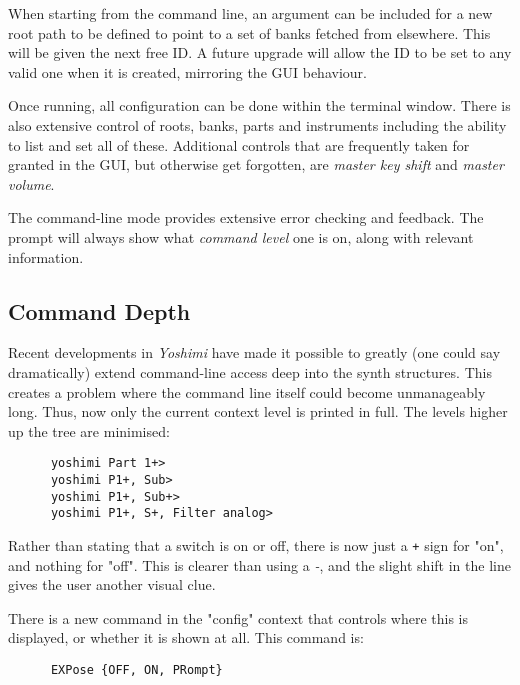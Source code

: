    When starting from the command line, an argument can be included for a new
   root path to be defined to point to a set of banks fetched from elsewhere.
   This will be given the next free ID. A future upgrade will allow the ID to
   be set to any valid one when it is created, mirroring the GUI behaviour.

   Once running, all configuration can be done within the terminal
   window.  There is also extensive control of roots, banks, parts and
   instruments including the ability to list and set all of these.
   Additional controls that are frequently taken for granted in the GUI, but
   otherwise get forgotten, are \textsl{master key shift} and \textsl{master
   volume}.

   The command-line mode provides extensive error checking and feedback.
   The prompt will always show what \textsl{command level}
   one is on, along with relevant information.

   \subsection{Command Depth}
\label{subsec:command_line_command_depth}

   Recent developments in \textsl{Yoshimi} have made it possible to greatly
   (one could say dramatically) extend command-line access deep into the
   synth structures. This creates a problem where the command line itself
   could become unmanageably long.
   Thus, now only the current context level is printed in full. The levels
   higher up the tree are minimised:

   \begin{verbatim}
      yoshimi Part 1+>
      yoshimi P1+, Sub>
      yoshimi P1+, Sub+>
      yoshimi P1+, S+, Filter analog>
   \end{verbatim}

   Rather than stating that a switch is on or off, there is now just a
   \texttt{+} sign for "on", and nothing for "off". This is clearer than
   using a \textsl{-}, and the slight shift in the line gives the user
   another visual clue.

   There is a new command in the "config" context that controls where this is
   displayed, or whether it is shown at all.
   This command is:

   \begin{verbatim}
      EXPose {OFF, ON, PRompt}
   \end{verbatim}

